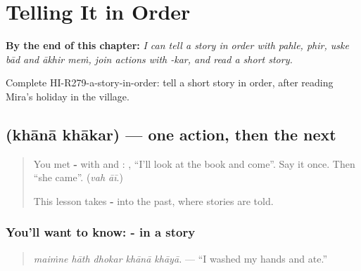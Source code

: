 
\chapter{Telling It in Order}
\label{ch:hi-telling-it-in-order}

\begin{chapteropening}
\textbf{By the end of this chapter:} \emph{I can tell a story in order with pahle, phir, uske bād and ākhir meṁ, join actions with -kar, and read a short story.}

Complete HI-R279-a-story-in-order: tell a short story in order, after reading Mira's holiday in the village.
\end{chapteropening}

\section[\texorpdfstring{\hi{खाना} \hi{खाकर} (khānā khākar)}{खाना खाकर (khānā khākar)}]{  (khānā khākar) — one action, then the next}

\label{lesson:HI-C279-khakar}



\begin{quote}
You met \textbf{-} with \textbf{} and \textbf{}: \textbf{    }, \textquotedblleft{}I'll look at the book and come\textquotedblright{}. Say it once. Then \textquotedblleft{}she came\textquotedblright{}. (\emph{vah āī}.)

This lesson takes \textbf{-} into the past, where stories are told.
\end{quote}

\subsection*{You'll want to know: - in a story}
\begin{quote}
\textbf{    }
\end{quote}

\begin{quote}
\emph{maiṁne hāth dhokar khānā khāyā.} — \textquotedblleft{}I washed my hands and ate.\textquotedblright{}
\end{quote}

